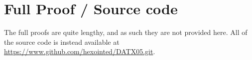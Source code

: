 \chapter{Full Proof / Source code}

	The full proofs are quite lengthy, and as such they are not provided here.
	All of the source code is instead available at
	\url{https://www.github.com/hexointed/DATX05.git}.
